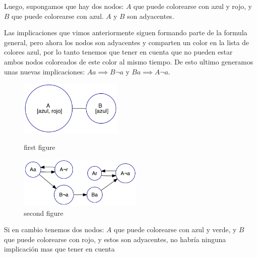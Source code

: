 \documentclass{article}
\theoremstyle{definition}
\theoremstyle{remark}
\begin{document}
Luego, supongamos que hay dos nodos: $A$ que puede colorearse con azul y rojo, y $B$ que puede colorearse con azul. $A$ y $B$ son adyacentes.

Las implicaciones que vimos anteriormente siguen formando parte de la formula general, pero ahora los nodos son adyacentes y comparten un color en la lista de colores azul, por lo tanto tenemos que tener en cuenta que no pueden estar ambos nodos coloreados de este color al mismo tiempo. De esto ultimo generamos unas nuevas implicaciones: $Aa \implies B\neg a$ y $Ba \implies A\neg a$.

\begin{figure}
\centering
\begin{minipage}{0.45\textwidth}
\centering
\includegraphics[width=5cm]{graphs/ej1/ej1_intro_2na.png}
\caption{first figure}
\end{minipage}\hfill
\begin{minipage}{0.45\textwidth}
\centering
\includegraphics[width=6cm]{graphs/ej1/ej1_intro_2na_impl.png}
\caption{second figure}
\end{minipage}
\end{figure}

Si en cambio tenemos dos nodos: $A$ que puede colorearse con azul y verde, y $B$ que puede colorearse con rojo, y estos son adyacentes, no habría ninguna implicación mas que tener en cuenta
\end{document}
